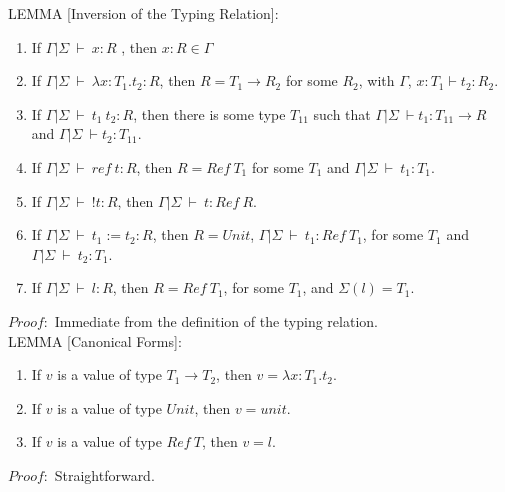 \documentclass [proof]{article}
\newcommand{\env}{{\Gamma | \Sigma \ \vdash}}
\begin{document}
LEMMA [Inversion of the Typing Relation]:
\begin{enumerate}
\item If $\env \ x : R$ , then $x : R \in \Gamma$
\item If $\env \ \lambda x: T_1. t_2 : R$, then $R = T_1 \to R_2$ for some $R_2$, with $\Gamma$, $x : T_1\vdash t_2 : R_2$.
\item If $\env \  t_1 \ t_2 : R$, then there is some type $T_{11}$ such that $\env t_1 : T_{11} \to R$ and $\env t_2 : T_{11}$.
\item If $\env \ ref \ t : R$, then $R = Ref \ T_1$ for some $T_1$ and $\env \ t_1 : T_1.$
\item If $\env \ !t : R$, then $\env \ t : Ref \ R$. 
\item If $\env \ t_1:= t_2 : R$, then $R = Unit$, $\env \ t_1 : Ref \ T_1$, for some $T_1$ and $\env \ t_2 : T_1$.
\item If $\env \ l : R$, then $R = Ref \ T_1$, for some $T_1$, and $\Sigma (l) = T_1$.
\end{enumerate}
$Proof:$ Immediate from the definition of the typing relation.\ \\

LEMMA [Canonical Forms]:
\begin{enumerate}
\item If $v$ is a value of type $T_1 \to T_2$, then $v = \lambda x : T_1. t_2$.
\item If $v$ is a value of type $Unit$, then $v = unit$.
\item If $v$ is a value of type $Ref \ T$, then $v = l$.
\end{enumerate}
$Proof:$ Straightforward.\ \\
\end{document}
